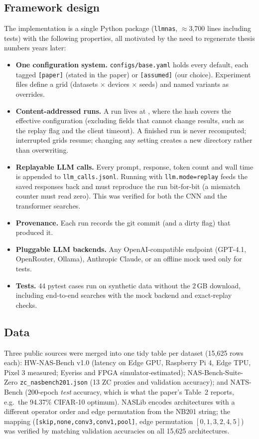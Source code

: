 \documentclass[11pt,a4paper]{article}
\newcommand{\code}[1]{\texttt{#1}}
\begin{document}
\subsection{Framework design}
The implementation is a single Python package (\code{llmnas}, $\approx$3{,}700 lines including tests) with the following properties, all motivated by the need to regenerate thesis numbers years later:
\begin{itemize}[nosep]
  \item \textbf{One configuration system.} \code{configs/base.yaml} holds every default, each tagged \code{[paper]} (stated in the paper) or \code{[assumed]} (our choice). Experiment files define a grid (datasets $\times$ devices $\times$ seeds) and named variants as overrides.
  \item \textbf{Content-addressed runs.} A run lives at , where the hash covers the effective configuration (excluding fields that cannot change results, such as the replay flag and the client timeout). A finished run is never recomputed; interrupted grids resume; changing any setting creates a new directory rather than overwriting.
  \item \textbf{Replayable LLM calls.} Every prompt, response, token count and wall time is appended to \code{llm\_calls.jsonl}. Running with \code{llm.mode=replay} feeds the saved responses back and must reproduce the run bit-for-bit (a mismatch counter must read zero). This was verified for both the CNN and the transformer searches.
  \item \textbf{Provenance.} Each run records the git commit (and a dirty flag) that produced it.
  \item \textbf{Pluggable LLM backends.} Any OpenAI-compatible endpoint (GPT-4.1, OpenRouter, Ollama), Anthropic Claude, or an offline mock used only for tests.
  \item \textbf{Tests.} 44 pytest cases run on synthetic data without the 2\,GB download, including end-to-end searches with the mock backend and exact-replay checks.
\end{itemize}

\subsection{Data}
Three public sources were merged into one tidy table per dataset (15{,}625 rows each):
HW-NAS-Bench v1.0 (latency on Edge GPU, Raspberry Pi 4, Edge TPU, Pixel 3 measured; Eyeriss and FPGA simulator-estimated);
NAS-Bench-Suite-Zero \code{zc\_nasbench201.json} (13 ZC proxies and validation accuracy);
and NATS-Bench \cite{nats} (200-epoch \emph{test} accuracy, which is what the paper's Table~2 reports, e.g.\ the 94.37\% CIFAR-10 optimum).
NASLib encodes architectures with a different operator order and edge permutation from the NB201 string; the mapping (\code{[skip,none,conv3,conv1,pool]}, edge permutation $[0,1,3,2,4,5]$) was verified by matching validation accuracies on all 15{,}625 architectures.
\end{document}
